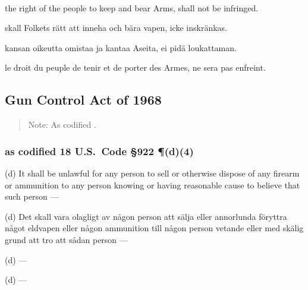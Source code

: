 \documentclass[a4paper,landscape,12pt]{article}
\begin{document}
~

\begin{minipage}[t]{0.22\textwidth}
the right of the people to keep and bear Arms, shall not be infringed.
\end{minipage}\textwidth
\begin{minipage}[t]{0.22\textwidth}
skall Folkets rätt att inneha och bära vapen, icke inskränkas.
\end{minipage}\textwidth
\begin{minipage}[t]{0.22\textwidth}
kansan oikeutta omistaa ja kantaa Aseita, ei pidä loukattaman.
\end{minipage}\textwidth
\begin{minipage}[t]{0.22\textwidth}
le droit du peuple de tenir et de porter des Armes, ne sera pas enfreint.
\end{minipage}

\subsection*{Gun Control Act of 1968}

\begin{quote}
	Note: As codified \cite{gpo-18usc922-2011,gpo-18usc922-2015,cornell-18usc922-1992}.
\end{quote}

\subsubsection*{as codified 18 U.S.~Code \S 922 \P(d)(4)}

\begin{minipage}[t]{0.22\textwidth}
(d) It shall be unlawful for any person to sell or otherwise dispose of any firearm or ammunition to any person knowing or having reasonable cause to believe that such person ---
\end{minipage}\textwidth
\begin{minipage}[t]{0.22\textwidth}
(d) Det skall vara olagligt av någon person att sälja eller annorlunda föryttra något eldvapen eller någon ammunition till någon person vetande eller med skälig grund att tro att sådan person ---
\end{minipage}\textwidth
\begin{minipage}[t]{0.22\textwidth}
(d) ---
\end{minipage}\textwidth
\begin{minipage}[t]{0.22\textwidth}
(d) ---
\end{minipage}
\end{document}
